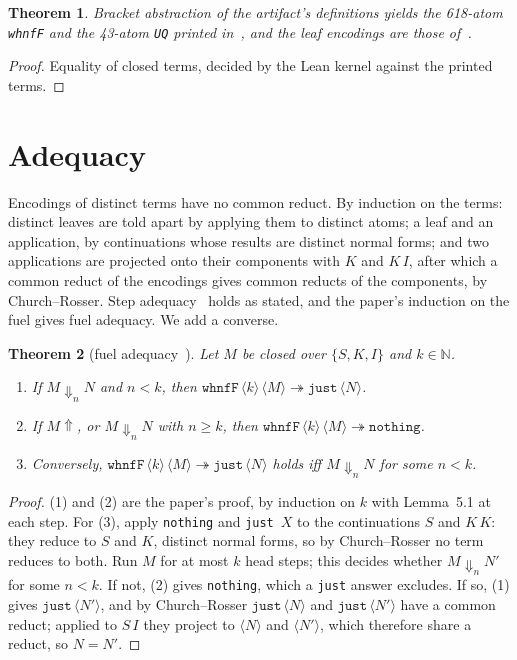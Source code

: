\documentclass[11pt]{amsart}
\newtheorem{theorem}{Theorem}
\newcommand{\tw}[1]{\texttt{#1}}
\newcommand{\enc}[1]{\langle #1\rangle}
\newcommand{\red}{\twoheadrightarrow}
\begin{document}
\begin{theorem}\label{thm:terms}
Bracket abstraction of the artifact's definitions yields the 618-atom \tw{whnfF} and the 43-atom
\tw{UQ} printed in~\citep[App.~A]{davis-si}, and the leaf encodings are those of~\citep[\S3.1]{davis-si}.
\end{theorem}
\begin{proof}
Equality of closed terms, decided by the Lean kernel against the printed terms.
\end{proof}

\section{Adequacy}

Encodings of distinct terms have no common reduct. By induction on the terms: distinct leaves are
told apart by applying them to distinct atoms; a leaf and an application, by continuations whose
results are distinct normal forms; and two applications are projected onto their components with $K$
and $K\,I$, after which a common reduct of the encodings gives common reducts of the components, by
Church--Rosser. Step
adequacy~\citep[Lemma~5.1]{davis-si} holds as stated, and the paper's induction on the fuel gives
fuel adequacy. We add a converse.

\begin{theorem}[fuel adequacy~{\citep[Thm.~5.2]{davis-si}}]\label{thm:fuel}
Let $M$ be closed over $\{S,K,I\}$ and $k\in\mathbb N$.
\begin{enumerate}
\item If $M\Downarrow_n N$ and $n<k$, then $\tw{whnfF}\,\enc k\,\enc M\red\tw{just}\,\enc N$.
\item If $M\Uparrow$, or $M\Downarrow_n N$ with $n\ge k$, then
  $\tw{whnfF}\,\enc k\,\enc M\red\tw{nothing}$.
\item Conversely, $\tw{whnfF}\,\enc k\,\enc M\red\tw{just}\,\enc N$ holds iff $M\Downarrow_n N$ for
  some $n<k$.
\end{enumerate}
\end{theorem}
\begin{proof}
(1) and (2) are the paper's proof, by induction on $k$ with Lemma~5.1 at each step. For (3), apply
\tw{nothing} and \tw{just}~$X$ to the continuations $S$ and $K\,K$: they reduce to $S$ and $K$,
distinct normal forms, so by Church--Rosser no term reduces to both. Run $M$ for at most $k$ head
steps; this decides whether $M\Downarrow_n N'$ for some $n<k$. If not, (2) gives \tw{nothing}, which
a \tw{just} answer excludes. If so, (1) gives $\tw{just}\,\enc{N'}$, and by Church--Rosser
$\tw{just}\,\enc N$ and $\tw{just}\,\enc{N'}$ have a common reduct; applied to $S\,I$ they project
to $\enc N$ and $\enc{N'}$, which therefore share a reduct, so $N=N'$.
\end{proof}
\end{document}
